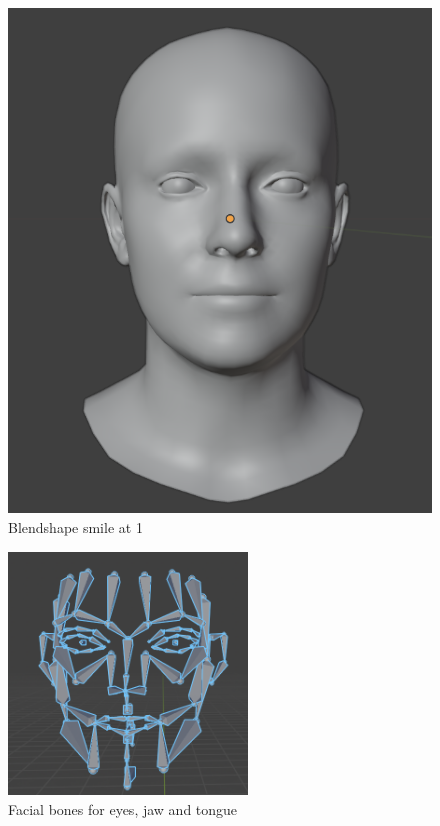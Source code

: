 \documentclass[../../main.tex]{subfiles}
\begin{document}
\begin{subfigure}{0.33\linewidth}
  \includegraphics[width=\linewidth]{chapters/background_work/images/blendshapes_example/blendshapes_example_1.png}
  \caption{Blendshape smile at 1}
  \label{fig:blendshapes_example}
\end{subfigure}

\begin{figure}
  \centering \includegraphics[width = 2.5in]{chapters/background_work/images/facial_bones.png}
  \caption{Facial bones for eyes, jaw and tongue}
  \label{fig:facial_bones}
\end{figure}
\end{document}
